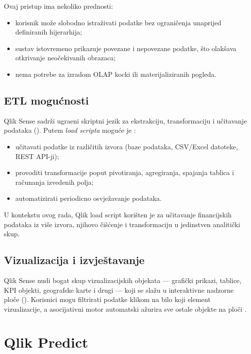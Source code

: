 \documentclass[zavrsnirad]{fer}
\begin{document}
Ovaj pristup ima nekoliko prednosti:
\begin{itemize}
    \item korisnik mo\v{z}e slobodno istra\v{z}ivati podatke bez ograni\v{c}enja unaprijed definiranih hijerarhija;
    \item sustav istovremeno prikazuje povezane i nepovezane podatke, \v{s}to olak\v{s}ava otkrivanje neo\v{c}ekivanih obrazaca;
    \item nema potrebe za izradom OLAP kocki ili materijalizi\-ra\-nih pogleda.
\end{itemize}

\subsection{ETL mogu\'{c}nosti}
\label{subsec:qlik_etl}

Qlik Sense sadr\v{z}i ugra\dj eni skriptni jezik za ekstrakciju, transformaciju i u\v{c}itavanje podataka (). Putem \textit{load scripta} mogu\'{c}e je \citep{qlik2024}:
\begin{itemize}
    \item u\v{c}itavati podatke iz razli\v{c}itih izvora (baze podataka, CSV/Excel datoteke, REST API-ji);
    \item provoditi transformacije poput pivotiranja, agregiranja, spajanja tablica i ra\v{c}unanja izvedenih polja;
    \item automatizirati periodicno osvje\v{z}avanje podataka.
\end{itemize}

U kontekstu ovog rada, Qlik load script kori\v{s}ten je za u\v{c}itavanje financijskih podataka iz vi\v{s}e izvora, njihovo \v{c}i\v{s}\'{c}enje i transformaciju u jedinstven analiti\v{c}ki skup.

\subsection{Vizualizacija i izvje\v{s}tavanje}
\label{subsec:qlik_vizualizacija}

Qlik Sense nudi bogat skup vizualizacijskih objekata --- grafi\v{c}ki prikazi, tablice, KPI objekti, geografske karte i drugi --- koji se sla\v{z}u u interaktivne nadzorne plo\v{c}e (). Korisnici mogu filtrirati podatke klikom na bilo koji element vizualizacije, a asocijativni motor automatski a\v{z}urira sve ostale objekte na plo\v{c}i \citep{qlik2024}.

\section{Qlik Predict}
\label{sec:qlik_predict}
\end{document}
